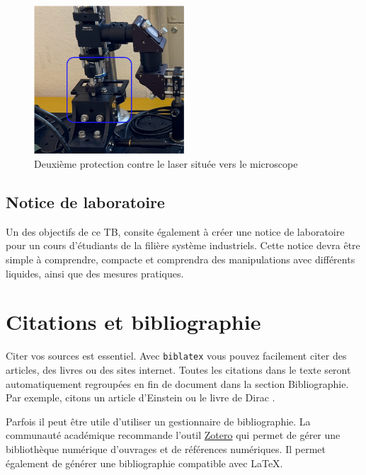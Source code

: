 \begin{figure}[H]
    \begin{center}
        \includegraphics[width=0.5\textwidth]{assets/figures/Introduction/protection_fin_laser.png}
    \end{center}
    \caption{Deuxième protection contre le laser située vers le microscope}
    \label{protection_laser_fin}
\end{figure}

\subsection{Notice de laboratoire}

Un des objectifs de ce TB, consite également à créer une notice de laboratoire pour un cours d'étudiants de la filière système industriels. Cette notice devra être simple à comprendre, compacte et comprendra des manipulations avec différents liquides, ainsi que des mesures pratiques.

\section{Citations et bibliographie}
Citer vos sources est essentiel. Avec \texttt{biblatex} vous pouvez facilement citer des articles, des livres ou des sites internet. Toutes les citations dans le texte seront automatiquement regroupées en fin de document dans la section \guillemotleft Bibliographie\guillemotright. Par exemple, citons un article d'Einstein \cite{einstein} ou le livre de Dirac \cite{dirac}.

Parfois il peut être utile d'utiliser un gestionnaire de bibliographie. La communauté académique recommande l'outil \href{https://www.zotero.org/}{Zotero} qui permet de gérer une bibliothèque numérique d'ouvrages et de références numériques. Il permet également de générer une bibliographie compatible avec \LaTeX.

